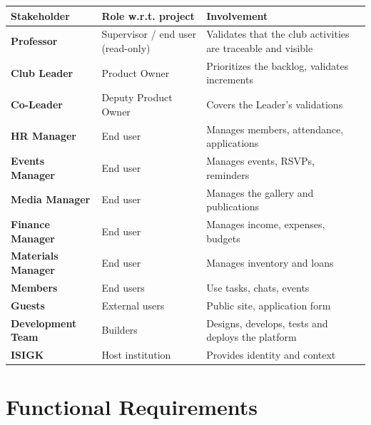 \documentclass[12pt,a4paper]{report}
\begin{document}
\begin{center}
\begin{tabular}{>{\bfseries}p{2.6cm} p{3.2cm} p{7.4cm}}
\toprule
\textbf{Stakeholder} & \textbf{Role w.r.t. project} & \textbf{Involvement} \\
\midrule
Professor        & Supervisor / end user (read-only) & Validates that the club
    activities are traceable and visible \\
Club Leader      & Product Owner & Prioritizes the backlog, validates increments \\
Co-Leader        & Deputy Product Owner & Covers the Leader's validations \\
HR Manager       & End user & Manages members, attendance, applications \\
Events Manager   & End user & Manages events, RSVPs, reminders \\
Media Manager    & End user & Manages the gallery and publications \\
Finance Manager  & End user & Manages income, expenses, budgets \\
Materials Manager& End user & Manages inventory and loans \\
Members          & End users & Use tasks, chats, events \\
Guests           & External users & Public site, application form \\
Development Team & Builders & Designs, develops, tests and deploys the platform \\
ISIGK            & Host institution & Provides identity and context \\
\bottomrule
\end{tabular}
\end{center}

\section{Functional Requirements}
\end{document}
